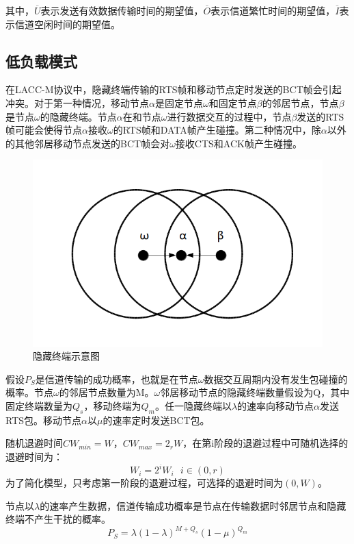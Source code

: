 其中，$\overline U$表示发送有效数据传输时间的期望值，$\overline O$表示信道繁忙时间的期望值，$\overline I$表示信道空闲时间的期望值。
	
\subsection {低负载模式}
在LACC-M协议中，隐藏终端传输的RTS帧和移动节点定时发送的BCT帧会引起冲突。对于第一种情况，移动节点$\alpha$是固定节点$\omega$和固定节点$\beta$的邻居节点，节点$\beta$是节点$\omega$的隐藏终端。节点$\alpha$在和节点$\omega$进行数据交互的过程中，节点$\beta$发送的RTS帧可能会使得节点$\alpha$接收$\omega$的RTS帧和DATA帧产生碰撞。第二种情况中，除$\alpha$以外的其他邻居移动节点发送的BCT帧会对$\omega$接收CTS和ACK帧产生碰撞。

\begin{figure}[!ht]
	\centering
	\includegraphics[scale=0.2]{figures/hidden.png}
	\caption{
		隐藏终端示意图
	}
	\label{fig:example}
\end{figure}

假设$P_S$是信道传输的成功概率，也就是在节点$\omega$数据交互周期内没有发生包碰撞的概率。节点$\omega$的邻居节点数量为M。$\omega$邻居移动节点的隐藏终端数量假设为Q，其中固定终端数量为$Q_s$，移动终端为$Q_m$。任一隐藏终端以$\lambda$的速率向移动节点$\alpha$发送RTS包。移动节点$\alpha$以$\mu$的速率定时发送BCT包。

随机退避时间$CW_{min}=W$，$CW_{max}=2_r W$，在第i阶段的退避过程中可随机选择的退避时间为：
\begin{equation}
W_i=2^iW_i \ \ \ i\in(0,r)
\end{equation}
为了简化模型，只考虑第一阶段的退避过程，可选择的退避时间为$(0,W)$。

节点以$\lambda$的速率产生数据，信道传输成功概率是节点在传输数据时邻居节点和隐藏终端不产生干扰的概率。
\begin{equation}
P_S=\lambda(1-\lambda)^{M+Q_s}(1-\mu)^{Q_m}
\end{equation}

